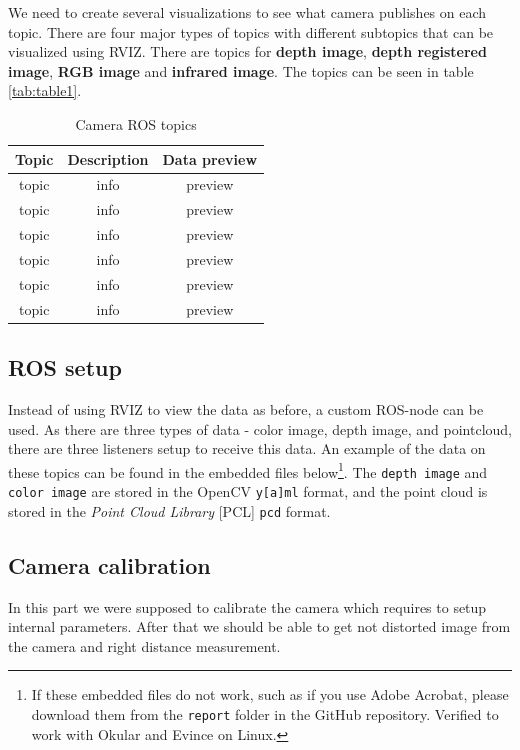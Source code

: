 \documentclass[11pt]{article}
\begin{document}
We need to create several visualizations to see what camera publishes on each topic. There are four major types of topics with different subtopics that can be visualized using RVIZ. There are topics for \textbf{depth image}, \textbf{depth registered image}, \textbf{RGB image} and \textbf{infrared image}.  The topics can be seen in table \vref{tab:table1}. \par
\begin{table}[h!]
  \centering
  \caption{Camera ROS topics}
  \label{tab:table1}
  \begin{tabular}{ccc}
    \toprule
    Topic & Description & Data preview\\
    \midrule
    topic & info & preview\\
    topic & info & preview\\
    topic & info & preview\\
    topic & info & preview\\
    topic & info & preview\\
    topic & info & preview\\
    \bottomrule
  \end{tabular}
\end{table}
\subsection{ROS setup}
Instead of using RVIZ to view the data as before, a custom ROS-node can be used. As there are three types of data - color image, depth image, and pointcloud, there are three listeners setup to receive this data. An example of the data on these topics can be found in the embedded files below\footnote{If these embedded files do not work, such as if you use Adobe Acrobat, please download them from the \texttt{report} folder in the GitHub repository. Verified to work with Okular and Evince on Linux.}. The \texttt{depth image} and \texttt{color image} are stored in the OpenCV \texttt{y[a]ml} format, and the point cloud is stored in the \emph{Point Cloud Library} [PCL] \texttt{pcd} format.\par

\begin{center}
\end{center}

\subsection{Camera calibration}
	In this part we were supposed to calibrate the camera which requires to setup internal parameters. After that we should be able to get not distorted image from the camera and right distance measurement. \par
\end{document}
